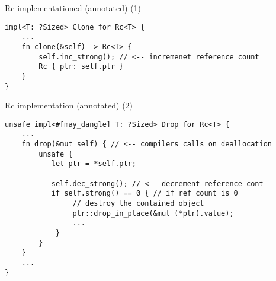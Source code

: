 
\begin{frame}[fragile,label=rcImplA]{Rc implementationed (annotated) (1)}
\begin{verbatim}
impl<T: ?Sized> Clone for Rc<T> {
    ... 
    fn clone(&self) -> Rc<T> {
        self.inc_strong(); // <-- incremenet reference count
        Rc { ptr: self.ptr }
    }
}
\end{verbatim}
\end{frame}

\begin{frame}[fragile,label=rcImplB]{Rc implementation (annotated) (2)}
\begin{verbatim}
unsafe impl<#[may_dangle] T: ?Sized> Drop for Rc<T> {
    ...
    fn drop(&mut self) { // <-- compilers calls on deallocation
        unsafe {
           let ptr = *self.ptr;

           self.dec_strong(); // <-- decrement reference cont
           if self.strong() == 0 { // if ref count is 0
                // destroy the contained object
                ptr::drop_in_place(&mut (*ptr).value);
                ...
            }
        }
    }
    ...
}
\end{verbatim}
\end{frame}

